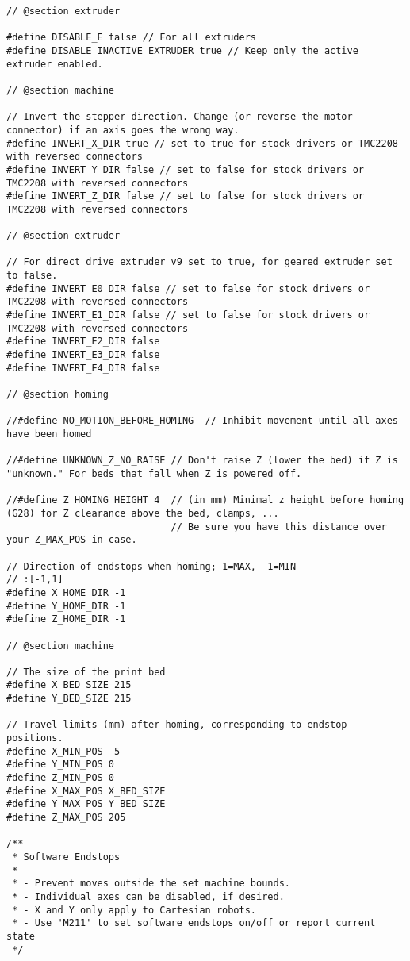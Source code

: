 \begin{lstlisting}
// @section extruder

#define DISABLE_E false // For all extruders
#define DISABLE_INACTIVE_EXTRUDER true // Keep only the active extruder enabled.

// @section machine

// Invert the stepper direction. Change (or reverse the motor connector) if an axis goes the wrong way.
#define INVERT_X_DIR true // set to true for stock drivers or TMC2208 with reversed connectors
#define INVERT_Y_DIR false // set to false for stock drivers or TMC2208 with reversed connectors
#define INVERT_Z_DIR false // set to false for stock drivers or TMC2208 with reversed connectors

// @section extruder

// For direct drive extruder v9 set to true, for geared extruder set to false.
#define INVERT_E0_DIR false // set to false for stock drivers or TMC2208 with reversed connectors
#define INVERT_E1_DIR false // set to false for stock drivers or TMC2208 with reversed connectors
#define INVERT_E2_DIR false
#define INVERT_E3_DIR false
#define INVERT_E4_DIR false

// @section homing

//#define NO_MOTION_BEFORE_HOMING  // Inhibit movement until all axes have been homed

//#define UNKNOWN_Z_NO_RAISE // Don't raise Z (lower the bed) if Z is "unknown." For beds that fall when Z is powered off.

//#define Z_HOMING_HEIGHT 4  // (in mm) Minimal z height before homing (G28) for Z clearance above the bed, clamps, ...
                             // Be sure you have this distance over your Z_MAX_POS in case.

// Direction of endstops when homing; 1=MAX, -1=MIN
// :[-1,1]
#define X_HOME_DIR -1
#define Y_HOME_DIR -1
#define Z_HOME_DIR -1

// @section machine

// The size of the print bed
#define X_BED_SIZE 215
#define Y_BED_SIZE 215

// Travel limits (mm) after homing, corresponding to endstop positions.
#define X_MIN_POS -5
#define Y_MIN_POS 0
#define Z_MIN_POS 0
#define X_MAX_POS X_BED_SIZE
#define Y_MAX_POS Y_BED_SIZE
#define Z_MAX_POS 205

/**
 * Software Endstops
 *
 * - Prevent moves outside the set machine bounds.
 * - Individual axes can be disabled, if desired.
 * - X and Y only apply to Cartesian robots.
 * - Use 'M211' to set software endstops on/off or report current state
 */


\end{lstlisting}
